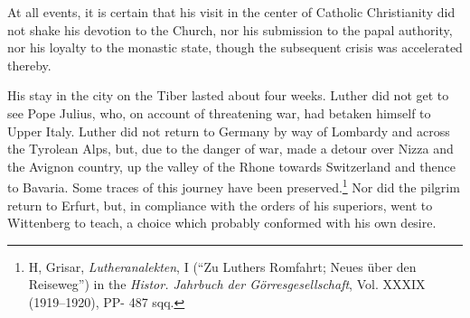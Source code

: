 At all events, it is certain that his visit in the center of Catholic
Christianity did not shake his devotion to the Church, nor his submission
to the papal authority, nor his loyalty to the monastic state,
though the subsequent crisis was accelerated thereby.

His stay in the city on the Tiber lasted about four weeks. Luther
did not get to see Pope Julius, who, on account of threatening war,
had betaken himself to Upper Italy. Luther did not return to Germany
by way of Lombardy and across the Tyrolean Alps, but, due
to the danger of war, made a detour over Nizza and the Avignon
country, up the valley of the Rhone towards Switzerland and thence
to Bavaria. Some traces of this journey have been preserved.\footnote{
H, Grisar, \textit{Lutheranalekten}, I (``Zu Luthers Romfahrt; Neues über den Reiseweg'')
in the \textit{Histor. Jahrbuch der Görresgesellschaft}, Vol. XXXIX (1919--1920), PP- 487 sqq.}
Nor did the pilgrim return to Erfurt, but, in compliance with the orders
of his superiors, went to Wittenberg to teach, a choice which probably
conformed with his own desire.
